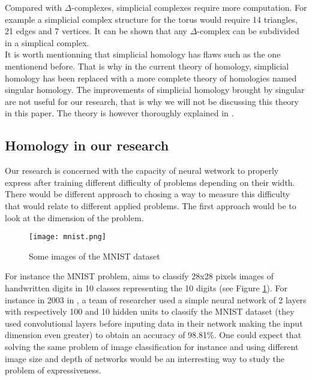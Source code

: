 \documentclass[12pt, a4paper]{article}
\begin{document}
Compared with $\Delta$-complexes, simplicial complexes require more computation. For example a simplicial complex structure for the torus would require 14 triangles, 21 edges and 7 vertices. It can be shown that any $\Delta$-complex can be subdivided in a simplical complex.\\


It is worth mentionning that simplicial homology has flaws such as the one mentionend before. That is why in the current theory of homology, simplicial homology has been replaced with a more complete theory of homologies named singular homology. The improvements of simplicial homology brought by singular are not useful for our research, that is why we will not be discussing this theory in this paper. The theory is however thoroughly explained in \cite{hatcher_algebraic_2002}.

\subsection{Homology in our research}

Our research is concerned with the capacity of neural wetwork to properly express after training different difficulty of problems depending on their width. There would be different approach to chosing a way to measure this difficulty that would relate to different applied problems. The first approach would be to look at the dimension of the problem.\\

\begin{figure}[h]
  \centering
  \texttt{[image: mnist.png]}
  \caption{Some images of the MNIST dataset}
  \label{fig:mnist}
\end{figure}

For instance the MNIST problem, aims to classify 28x28 pixels images of handwritten digits in 10 classes representing the 10 digits (see Figure \ref{fig:mnist}). For instance in 2003 in \cite{simard_best_2003}, a team of researcher used a simple neural network of 2 layers with respectively 100 and 10 hidden units to classify the MNIST dataset (they used convolutional layers before inputing data in their network making the input dimension even greater) to obtain an accuracy of 98.81\%. One could expect that solving the same problem of image classification for instance and using different image size and depth of networks would be an interresting way to study the problem of expressiveness.\\
\end{document}
